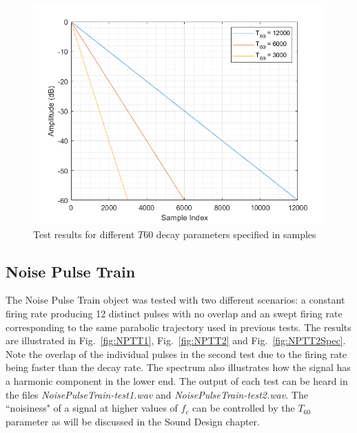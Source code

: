 \documentclass[../main.tex]{subfiles}
\begin{document}
\begin{figure}[ht]
    \centering
    \includegraphics[scale=.55]{./images/plots/ExpDecayTest1.png}
    \caption{Test results for different $T60$ decay parameters specified in samples}
    \label{fig:ExpDecayTest1}
\end{figure}
 
\subsection{Noise Pulse Train}
The Noise Pulse Train object was tested with two different scenarios: a constant firing rate producing 12 distinct pulses with no overlap and an swept firing rate corresponding to the same parabolic trajectory used in previous tests. The results are illustrated in Fig.~\ref{fig:NPTT1}, Fig.~\ref{fig:NPTT2} and Fig.~\ref{fig:NPTT2Spec}. Note the overlap of the individual pulses in the second test due to the firing rate being faster than the decay rate. The spectrum also illustrates how the signal has a harmonic component in the lower end. The output of each test can be heard in the files \emph{NoisePulseTrain-test1.wav} and \emph{NoisePulseTrain-test2.wav}. The ``noisiness" of a signal at higher values of $f_c$ can be controlled by the $T_{60}$ parameter as will be discussed in the Sound Design chapter.
\end{document}
